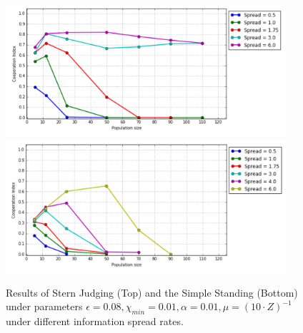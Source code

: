 \documentclass[10pt,a4paper]{article}
\begin{document}
\begin{figure}[h!]
\begin{center}
  \includegraphics[width=28em]{comms_SJ.PNG}
  \includegraphics[width=28em]{comms_SS.PNG}
\end{center}
  \caption{Results of Stern Judging (Top) and the Simple Standing (Bottom) under parameters $\epsilon = 0.08, \chi_{min} = 0.01, \alpha = 0.01, \mu = (10 \cdot Z)^{-1}$ under different information spread rates.}
  \label{fig:CommResults}
\end{figure}
\end{document}
